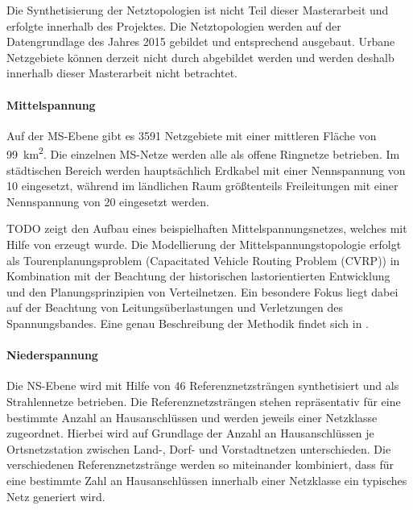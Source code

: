 Die Synthetisierung der Netztopologien ist nicht Teil dieser Masterarbeit und erfolgte innerhalb des \openego Projektes. \cite{Mueller2019}
Die Netztopologien werden auf der Datengrundlage des Jahres \num{2015} gebildet und entsprechend ausgebaut.
Urbane Netzgebiete können derzeit nicht durch \dingo abgebildet werden und werden deshalb innerhalb dieser Masterarbeit nicht betrachtet.


\paragraph{Mittelspannung}

Auf der \gls{MS}-Ebene gibt es \num{3591} Netzgebiete mit einer mittleren Fläche von \SI{99}{\km\squared}.
Die einzelnen \gls{MS}-Netze werden alle als offene Ringnetze betrieben.
Im städtischen Bereich werden hauptsächlich Erdkabel mit einer Nennspannung von \SI{10}{\kv} eingesetzt, während im ländlichen Raum größtenteils Freileitungen mit einer Nennspannung von \SI{20}{\kv} eingesetzt werden. \cite{Mueller2019}\medskip


{\color{red} TODO} zeigt den Aufbau eines beispielhaften Mittelspannungsnetzes, welches mit Hilfe von \dingo erzeugt wurde.
Die Modellierung der Mittelspannungstopologie erfolgt als Tourenplanungsproblem (Capacitated Vehicle Routing
Problem (CVRP)) in Kombination mit der Beachtung der historischen lastorientierten Entwicklung und den Planungsprinzipien von Verteilnetzen.
Ein besondere Fokus liegt dabei auf der Beachtung von Leitungsüberlastungen und Verletzungen des Spannungsbandes.
Eine genau Beschreibung der Methodik findet sich in \cite{Amme2018}.


\paragraph{Niederspannung}

Die \gls{NS}-Ebene wird mit Hilfe von \num{46} Referenznetzsträngen synthetisiert und als Strahlennetze betrieben.
Die Referenznetzsträngen stehen repräsentativ für eine bestimmte Anzahl an Hausanschlüssen und werden jeweils einer Netzklasse zugeordnet.
Hierbei wird auf Grundlage der Anzahl an Hausanschlüssen je Ortsnetzstation zwischen Land-, Dorf- und Vorstadtnetzen unterschieden.
Die verschiedenen Referenznetzstränge werden so miteinander kombiniert, dass für eine bestimmte Zahl an Hausanschlüssen innerhalb einer Netzklasse ein typisches Netz generiert wird. \cite{Mueller2019}


